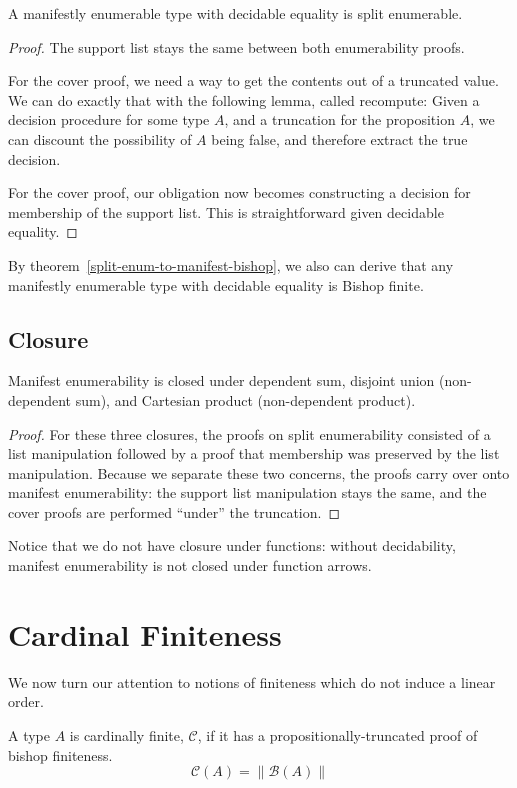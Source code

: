 \begin{theorem} \label{manifest-enum-to-split}
  A manifestly enumerable type with decidable equality is split enumerable.
\end{theorem}
\begin{proof}
  The support list stays the same between both enumerability proofs.

  For the cover proof, we need a way to get the contents out of a truncated
  value.
  We can do exactly that with the following lemma, called recompute:
  Given a decision procedure for some type \(A\), and a truncation for the
  proposition \(A\), we can discount the possibility of \(A\) being false, and
  therefore extract the true decision.

  For the cover proof, our obligation now becomes constructing a decision for
  membership of the support list.
  This is straightforward given decidable equality.

\end{proof}
By theorem~\ref{split-enum-to-manifest-bishop}, we also can derive that any
manifestly enumerable type with decidable equality is Bishop finite.
\subsection{Closure}
\begin{lemma}
  Manifest enumerability is closed under dependent sum, disjoint union
  (non-dependent sum), and Cartesian product (non-dependent product).
\end{lemma}
\begin{proof}
  For these three closures, the proofs on split enumerability consisted of a
  list manipulation followed by a proof that membership was preserved by the
  list manipulation.
  Because we separate these two concerns, the proofs carry over onto manifest
  enumerability: the support list manipulation stays the same, and the
  cover proofs are performed ``under'' the truncation.
\end{proof}
Notice that we do not have closure under functions: without decidability,
manifest enumerability is not closed under function arrows.
\section{Cardinal Finiteness} \label{cardinal}
We now turn our attention to notions of finiteness which do not induce a linear
order.
\begin{definition}
  A type \(A\) is cardinally finite, \(\mathcal{C}\), if it has a
  propositionally-truncated proof of bishop finiteness.
  \begin{equation}
    \mathcal{C}(A) = \lVert \mathcal{B}(A) \rVert
  \end{equation}
\end{definition}
